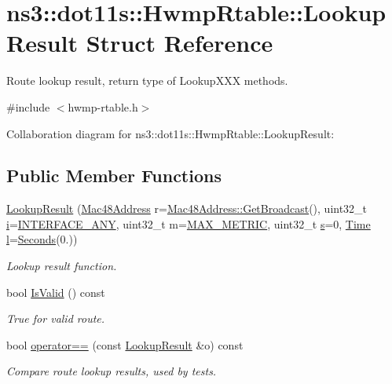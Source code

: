 \hypertarget{structns3_1_1dot11s_1_1HwmpRtable_1_1LookupResult}{}\section{ns3\+:\+:dot11s\+:\+:Hwmp\+Rtable\+:\+:Lookup\+Result Struct Reference}
\label{structns3_1_1dot11s_1_1HwmpRtable_1_1LookupResult}


Route lookup result, return type of Lookup\+X\+XX methods.  




{\ttfamily \#include $<$hwmp-\/rtable.\+h$>$}



Collaboration diagram for ns3\+:\+:dot11s\+:\+:Hwmp\+Rtable\+:\+:Lookup\+Result\+:
\subsection*{Public Member Functions}
\begin{DoxyCompactItemize}
\item 
\hyperlink{structns3_1_1dot11s_1_1HwmpRtable_1_1LookupResult_a15b130d20f398698a8aaa5f3de51e01f}{Lookup\+Result} (\hyperlink{classns3_1_1Mac48Address}{Mac48\+Address} r=\hyperlink{classns3_1_1Mac48Address_a55156e302c6bf950c0b558365adbde84}{Mac48\+Address\+::\+Get\+Broadcast}(), uint32\+\_\+t \hyperlink{lte__uplink__power__control_8m_a6f6ccfcf58b31cb6412107d9d5281426}{i}=\hyperlink{classns3_1_1dot11s_1_1HwmpRtable_a2fa1f4fa97e71399696c2e9a8a95b838}{I\+N\+T\+E\+R\+F\+A\+C\+E\+\_\+\+A\+NY}, uint32\+\_\+t m=\hyperlink{classns3_1_1dot11s_1_1HwmpRtable_a3aed0da4da63b8109c4cb4eef396428e}{M\+A\+X\+\_\+\+M\+E\+T\+R\+IC}, uint32\+\_\+t \hyperlink{generate__test__data__lte__sinr_8m_ad83eeb3a142285d1243a08c6b7026df8}{s}=0, \hyperlink{classns3_1_1Time}{Time} \hyperlink{lte__pathloss_8m_a5b54c0a045f179bcbbbc9abcb8b5cd4c}{l}=\hyperlink{group__timecivil_ga33c34b816f8ff6628e33d5c8e9713b9e}{Seconds}(0.))
\begin{DoxyCompactList}\small\item\em Lookup result function. \end{DoxyCompactList}\item 
bool \hyperlink{structns3_1_1dot11s_1_1HwmpRtable_1_1LookupResult_a715a825cec34fcee7c693bc24262e4a5}{Is\+Valid} () const 
\begin{DoxyCompactList}\small\item\em True for valid route. \end{DoxyCompactList}\item 
bool \hyperlink{structns3_1_1dot11s_1_1HwmpRtable_1_1LookupResult_a9d2771a16281d619f76c498efe8255a9}{operator==} (const \hyperlink{structns3_1_1dot11s_1_1HwmpRtable_1_1LookupResult}{Lookup\+Result} \&o) const 
\begin{DoxyCompactList}\small\item\em Compare route lookup results, used by tests. \end{DoxyCompactList}\end{DoxyCompactItemize}

